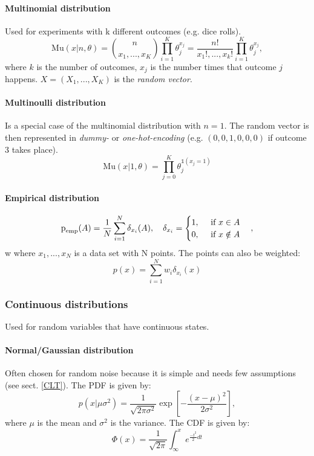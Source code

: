 \documentclass[../main.tex]{subfiles}
\begin{document}
        \paragraph{Multinomial distribution}  Used for experiments with k different outcomes (e.g. dice rolls).
                $$\text{Mu}(x|n,\theta) =  {n \choose x_1, ..., x_K}\prod_{i=1}^K\theta_j^{x_j} = \frac{n!}{x_1!, ..., x_k!}\prod_{i=1}^K\theta_j^{x_j},$$
                where $k$ is the number of outcomes, $x_j$ is the number times that outcome $j$ happens. $X = (X_1, ..., X_K)$ is the \textit{random vector}. 

        \paragraph{Multinoulli distribution}  Is a special case of the multinomial distribution with $n=1$. The random vector is then represented in \textit{dummy-} or \textit{one-hot-encoding} (e.g. $(0,0,1,0,0,0)$ if outcome 3 takes place).
                $$\text{Mu}(x|1,\theta) = \prod_{j=0}^K \theta_j^{\mathbb{1}(x_j=1)}$$

        \paragraph{Empirical distribution}  $$\text{p}_{\text{emp}}(A) = \frac{1}{N} \sum_{i=1}^N \delta_{x_i}(A), \text{\hspace{1em}} \delta_{x_i}=\begin{cases}1, \text{\hspace{1em} if } x \in A \\0, \text{\hspace{1em} if } x \notin A \end{cases},$$ w
                where $x_1, ..., x_N$ is a data set with N points. The points can also be weighted: 
                $$p(x) =  \sum_{i=1}^N w_i \delta_{x_i}(x)$$ 


    \subsubsection{Continuous distributions}
        Used for random variables that have continuous states.

        \paragraph{Normal/Gaussian distribution}   Often chosen for random noise because it is simple and needs few assumptions (see sect. \ref{CLT}). The PDF is given by: \label{Normal distribution}  $$p(x|\mu\sigma^2)= \frac{1}{\sqrt{2\pi\sigma^2}}\exp\left[-\frac{(x-\mu)^2}{2\sigma^2}\right],$$ where $\mu$ is the mean and $\sigma^2$ is the variance. The CDF is given by: $$\Phi(x) = \frac{1}{\sqrt{2\pi}}\int_{\infty}^xe^{\frac{-t^2}{2}dt}$$
\end{document}
